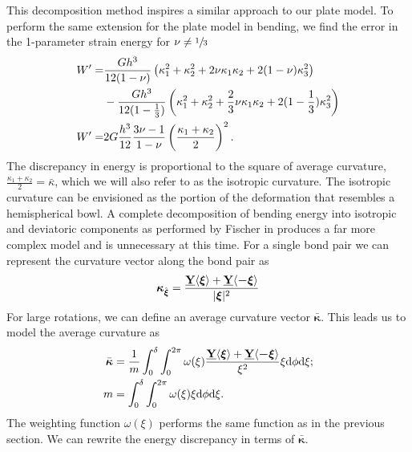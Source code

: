 \documentclass[preprint,review,12pt]{elsarticle}
\newcommand\vstate[3]{%
	\mathbf{\underline{#1}}%
	\ifstrempty{#2}{}{[#2]}%
	\ifstrempty{#3}{}{\langle #3 \rangle}}
\begin{document}
This decomposition method inspires a similar approach to our plate model. To perform the same extension for the plate model in bending, we find the error in the 1-parameter strain energy for \(\nu \neq \sfrac{1}{3}\)
%
\begin{align}
    W'=&\frac{G h^3}{12(1-\nu)} \left(\kappa_1^2+\kappa_2^2+2\nu\kappa_1\kappa_2+2(1-\nu)\kappa_3^2 \right)\notag\\
    &-\frac{G h^3}{12(1-\frac{1}{3})} \left(\kappa_1^2+\kappa_2^2+\frac{2}{3}\nu\kappa_1\kappa_2+2(1-\frac{1}{3})\kappa_3^2 \right) \notag \\
    W'=&2G \frac{h^3}{12}\frac{3\nu-1}{1-\nu} \left(\frac{\kappa_1+\kappa_2}{2}\right)^2.\notag
\end{align}
%
The discrepancy in energy is proportional to the square of average curvature, \(\frac{\kappa_1+\kappa_2}{2} = \bar{\kappa}\), which we will also refer to as the isotropic curvature.  The isotropic curvature can be envisioned as the portion of the deformation that resembles a hemispherical bowl.  A complete decomposition of bending energy into isotropic and deviatoric components as performed by Fischer in \cite{fischer1992bending} produces a far more complex model and is unnecessary at this time.  For a single bond pair we can represent the curvature vector along the bond pair as 
%
\begin{equation}
    \boldsymbol{\kappa} _{\hat{\boldsymbol{\xi}}} = \frac{\vstate{Y}{}{\boldsymbol{\xi}}+\vstate{Y}{}{\boldsymbol{-\xi}}}{|\boldsymbol{\xi}|^2}\notag
\end{equation}
%
%
For large rotations, we can define an average curvature vector \(\bar{\boldsymbol{\kappa}}\).
This leads us to model the average curvature as 
%
\begin{align}
    \bar{\boldsymbol{\kappa}} &= \frac{1}{m} \int_0^\delta \int_0^{2\pi}\omega(\xi)\frac{\vstate{Y}{}{\boldsymbol{\xi}}+\vstate{Y}{}{\boldsymbol{-\xi}}}{\xi^2} \xi {\rm d}\phi {\rm d}\xi ;\notag \\
    m &= \int_0^\delta \int_0^{2\pi}\omega(\xi)\xi {\rm d}\phi {\rm d}\xi. \notag
\end{align}
%
The weighting function \(\omega(\xi)\) performs the same function as in the previous section.
We can rewrite the energy discrepancy in terms of \(\bar{\boldsymbol{\kappa}}\).
\end{document}
